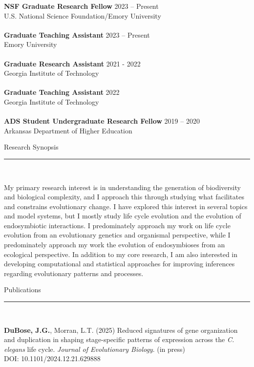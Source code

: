 \documentclass{article}
\begin{document}
\textbf{NSF Graduate Research Fellow} \hfill 2023 – Present \\
U.S. National Science Foundation/Emory University
\\
\\
\textbf{Graduate Teaching Assistant} \hfill 2023 – Present \\
Emory University
\\
\\
\textbf{Graduate Research Assistant} \hfill 2021 - 2022 \\
Georgia Institute of Technology
\\
\\
\textbf{Graduate Teaching Assistant} \hfill 2022 \\
Georgia Institute of Technology
\\
\\
\textbf{ADS Student Undergraduate Research Fellow} \hfill 2019 – 2020 \\
Arkansas Department of Higher Education
\\
\begin{flushleft}
{\Large Research Synopsis} \rule{16.51cm}{0.4pt}\\
\end{flushleft}
My primary research interest is in understanding the generation of biodiversity and biological complexity,
and I approach this through studying what facilitates and constrains evolutionary change. I have explored
this interest in several topics and model systems, but I mostly study life cycle evolution and the evolution 
of endosymbiotic interactions. I predominately approach my work on life cycle evolution from an 
evolutionary genetics and organismal perspective, while I predominately approach my work the evolution
of endosymbioses from an ecological perspective. In addition to my core research, I am also interested in 
developing computational and statistical approaches for improving inferences regarding evolutionary patterns 
and processes. 
\\

\pagebreak

\begin{flushleft}
{\Large Publications} \rule{16.51cm}{0.4pt}\\
\end{flushleft}

\hangindent=0.7cm \textbf{DuBose, J.G.}, Morran, L.T. (2025) Reduced signatures of gene organization and duplication in shaping stage-specific patterns of expression across the \emph{C. elegans} life cycle. \emph{Journal of Evolutionary Biology}. (in press) \\ 
DOI: 10.1101/2024.12.21.629888 \\
\end{document}
